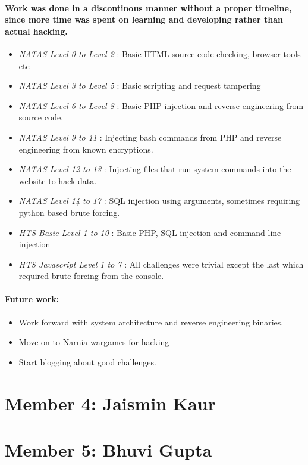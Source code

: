 \documentclass{article}
\begin{document}
\begin{itemize}
\paragraph{Work was done in a discontinous manner without a proper timeline, since more time was spent on learning and developing rather than actual hacking.}
\begin{itemize}
	\item \textit{NATAS Level 0 to Level 2} : Basic HTML source code checking, browser tools etc
	\item \textit{NATAS Level 3 to Level 5} : Basic scripting and request tampering
	\item \textit{NATAS Level 6 to Level 8} : Basic PHP injection and reverse engineering from source code. 
	\item \textit{NATAS Level 9 to 11} : Injecting bash commands from PHP and reverse engineering from known encryptions.
	\item \textit{NATAS Level 12 to 13} :  Injecting files that run system commands into the website to hack data. 
	\item \textit{NATAS Level 14 to 17} : SQL injection using arguments, sometimes requiring python based brute forcing. 
	\item \textit{HTS Basic Level 1 to 10} : Basic PHP, SQL injection and command line injection
	\item \textit{HTS Javascript Level 1 to 7} : All challenges were trivial except the last which required brute forcing from the console. 
\end{itemize}

\paragraph{Future work:}
\begin{itemize}
	\item Work forward with system architecture and reverse engineering binaries.
	\item Move on to Narnia wargames for hacking
	\item Start blogging about good challenges.
\end{itemize}


\newpage
\section*{Member 4: Jaismin Kaur}

\newpage
\section*{Member 5: Bhuvi Gupta}

\end{itemize}
\end{document}

